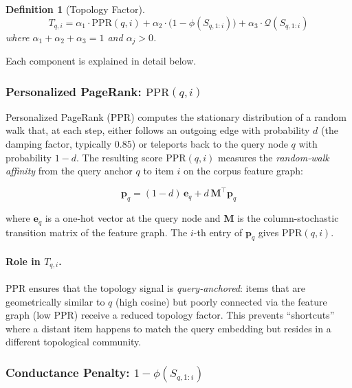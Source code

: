 \documentclass[11pt,a4paper]{article}
\newtheorem{definition}{Definition}
\begin{document}
\begin{definition}[Topology Factor]
\begin{equation}
  T_{q,i}
  = \alpha_1 \cdot \mathrm{PPR}(q, i)
  + \alpha_2 \cdot \bigl(1 - \phi(S_{q,1:i})\bigr)
  + \alpha_3 \cdot \mathcal{Q}(S_{q,1:i})
  \label{eq:topofactor}
\end{equation}
where $\alpha_1 + \alpha_2 + \alpha_3 = 1$ and $\alpha_j > 0$.
\end{definition}

Each component is explained in detail below.

\subsubsection{Personalized PageRank: $\mathrm{PPR}(q, i)$}

Personalized PageRank (PPR) \cite{stanford_ppr} computes the stationary
distribution of a random walk that, at each step, either follows an outgoing
edge with probability $d$ (the damping factor, typically $0.85$) or
teleports back to the query node $q$ with probability $1-d$.  The resulting
score $\mathrm{PPR}(q, i)$ measures the \emph{random-walk affinity} from
the query anchor $q$ to item $i$ on the corpus feature graph:

\begin{equation}
  \mathbf{p}_q = (1 - d) \, \mathbf{e}_q + d \, \mathbf{M}^{\!\top} \mathbf{p}_q
  \label{eq:ppr}
\end{equation}

where $\mathbf{e}_q$ is a one-hot vector at the query node and $\mathbf{M}$
is the column-stochastic transition matrix of the feature graph.  The $i$-th
entry of $\mathbf{p}_q$ gives $\mathrm{PPR}(q, i)$.

\paragraph{Role in $T_{q,i}$.}
PPR ensures that the topology signal is \emph{query-anchored}: items that are
geometrically similar to $q$ (high cosine) but poorly connected via the
feature graph (low PPR) receive a reduced topology factor.  This prevents
``shortcuts'' where a distant item happens to match the query embedding
but resides in a different topological community.

\subsubsection{Conductance Penalty: $1 - \phi(S_{q,1:i})$}
\end{document}
